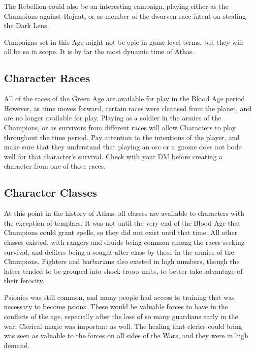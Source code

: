 The Rebellion could also be an interesting campaign, playing either as the Champions against Rajaat, or as member of the dwarven race intent on stealing the Dark Lens.

Campaigns set in this Age might not be epic in game level terms, but they will all be so in scope. It is by far the most dynamic time of Athas.

\subsection{Character Races}
All of the races of the Green Age are available for play in the Blood Age period. However, as time moves forward, certain races were cleansed from the planet, and are no longer available for play. Playing as a soldier in the armies of the Champions, or as survivors from different races will allow Characters to play throughout the time period. Pay attention to the intentions of the player, and make sure that they understand that playing an orc or a gnome does not bode well for that character's survival. Check with your DM before creating a character from one of those races.

\subsection{Character Classes}
At this point in the history of Athas, all classes are available to characters with the exception of templars. It was not until the very end of the Blood Age that Champions could grant spells, so they did not exist until that time. All other classes existed, with rangers and druids being common among the races seeking survival, and defilers being a sought after class by those in the armies of the Champions. Fighters and barbarians also existed in high numbers, though the latter tended to be grouped into shock troop units, to better take advantage of their ferocity.

Psionics was still common, and many people had access to training that was necessary to become psions. These would be valuable forces to have in the conflicts of the age, especially after the loss of so many guardians early in the war. Clerical magic was important as well. The healing that clerics could bring was seen as valuable to the forces on all sides of the Wars, and they were in high demand.
